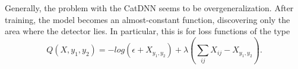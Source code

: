 Generally, the problem with the CatDNN seems to be overgeneralization. After training, the
model becomes an almost-constant function, discovering only the area where the detector lies.
In particular, this is for loss functions of the type
\[ Q(X, y_1, y_2) = -log(\epsilon + X_{y_1,y_2}) + \lambda(\sum_{ij}X_{ij} - X_{y_1,y_2}). \]
